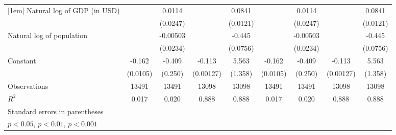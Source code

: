 {\begin{tabular}{l*{8}{c}}
[1em]
Natural log of GDP (in USD)&                     &      0.0114         &                     &      0.0841\sym{***}&                     &      0.0114         &                     &      0.0841\sym{***}\\
                    &                     &    (0.0247)         &                     &    (0.0121)         &                     &    (0.0247)         &                     &    (0.0121)         \\
[1em]
Natural log of population&                     &    -0.00503         &                     &      -0.445\sym{***}&                     &    -0.00503         &                     &      -0.445\sym{***}\\
                    &                     &    (0.0234)         &                     &    (0.0756)         &                     &    (0.0234)         &                     &    (0.0756)         \\
[1em]
Constant            &      -0.162\sym{***}&      -0.409         &      -0.113\sym{***}&       5.563\sym{***}&      -0.162\sym{***}&      -0.409         &      -0.113\sym{***}&       5.563\sym{***}\\
                    &    (0.0105)         &     (0.250)         &   (0.00127)         &     (1.358)         &    (0.0105)         &     (0.250)         &   (0.00127)         &     (1.358)         \\
\hline
Observations        &       13491         &       13491         &       13098         &       13098         &       13491         &       13491         &       13098         &       13098         \\
\(R^{2}\)           &       0.017         &       0.020         &       0.888         &       0.888         &       0.017         &       0.020         &       0.888         &       0.888         \\
\hline\hline
\multicolumn{9}{l}{\footnotesize Standard errors in parentheses}\\
\multicolumn{9}{l}{\footnotesize \sym{*} \(p<0.05\), \sym{**} \(p<0.01\), \sym{***} \(p<0.001\)}\\
\end{tabular}
}
